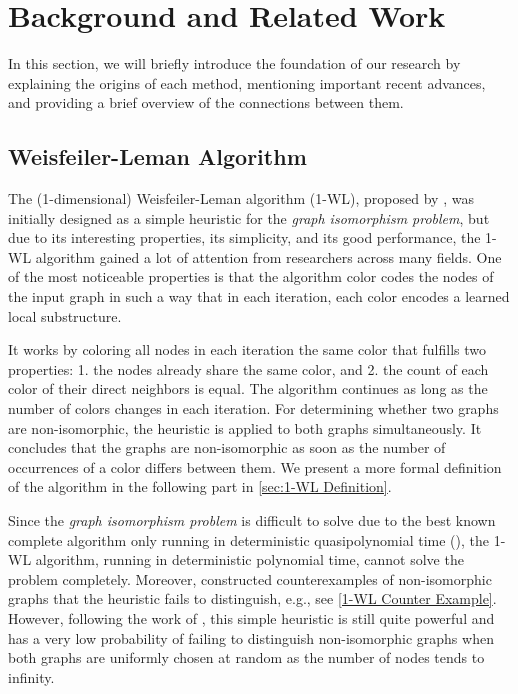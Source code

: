 \section{Background and Related Work}\label{sec:related_work}
In this section, we will briefly introduce the foundation of our research by explaining the origins of each method, mentioning important recent advances, and providing a brief overview of the connections between them.

\subsection{Weisfeiler-Leman Algorithm}
The (1-dimensional) Weisfeiler-Leman algorithm (1-WL), proposed by \cite{Wei+1968}, was initially designed as a simple heuristic for the \textit{graph isomorphism problem}, but due to its interesting properties, its simplicity, and its good performance, the 1-WL algorithm gained a lot of attention from researchers across many fields. One of the most noticeable properties is that the algorithm color codes the nodes of the input graph in such a way that in each iteration, each color encodes a learned local substructure.

It works by coloring all nodes in each iteration the same color that fulfills two properties: 1. the nodes already share the same color, and 2. the count of each color of their direct neighbors is equal. The algorithm continues as long as the number of colors changes in each iteration.
For determining whether two graphs are non-isomorphic, the heuristic is applied to both graphs simultaneously. It concludes that the graphs are non-isomorphic as soon as the number of occurrences of a color differs between them. We present a more formal definition of the algorithm in the following part in \autoref{sec:1-WL Definition}.

Since the \textit{graph isomorphism problem} is difficult to solve due to the best known complete algorithm only running in deterministic quasipolynomial time (\cite{Babai2016}), the 1-WL algorithm, running in deterministic polynomial time, cannot solve the problem completely. Moreover, \cite{Cai1992} constructed counterexamples of non-isomorphic graphs that the heuristic fails to distinguish, e.g., see \autoref{1-WL Counter Example}. However, following the work of \cite{Bab+1979}, this simple heuristic is still quite powerful and has a very low probability of failing to distinguish non-isomorphic graphs when both graphs are uniformly chosen at random as the number of nodes tends to infinity.

